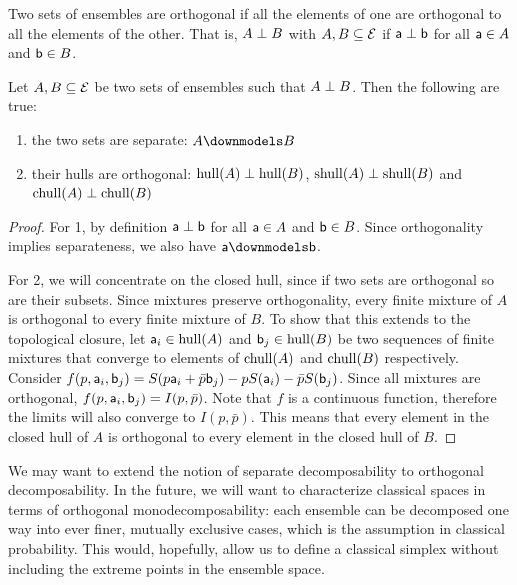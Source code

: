 \begin{mathSection}
\begin{defn}
	Two sets of ensembles are orthogonal if all the elements of one are orthogonal to all the elements of the other. That is, $A \ortho B$ with $A, B \subseteq \Ens$ if $\ens[a] \ortho \ens[b]$ for all $\ens[a] \in A$ and $\ens[b] \in B$. 
\end{defn}

\begin{prop}
	Let $A, B \subseteq \Ens$ be two sets of ensembles such that $A \ortho B$. Then the following are true:
	\begin{enumerate}
		\item the two sets are separate: $A \separate B$
		\item their hulls are orthogonal: $\hull(A) \ortho \hull(B)$, $\shull(A) \ortho \shull(B)$ and  \\ $\chull(A) \ortho \chull(B)$
	\end{enumerate}
\end{prop}

\begin{proof}
	For 1, by definition $\ens[a] \ortho \ens[b]$ for all $\ens[a] \in A$ and $\ens[b] \in B$. Since orthogonality implies separateness, we also have $\ens[a] \separate \ens[b]$.
	
	For 2, we will concentrate on the closed hull, since if two sets are orthogonal so are their subsets. Since mixtures preserve orthogonality, every finite mixture of $A$ is orthogonal to every finite mixture of $B$. To show that this extends to the topological closure, let $\ens[a]_i \in \hull(A)$ and $\ens[b]_j \in \hull(B)$ be two sequences of finite mixtures that converge to elements of $\chull(A)$ and $\chull(B)$ respectively. Consider $f(p,\ens[a]_i, \ens[b]_j) = S(p \ens[a]_i + \bar{p} \ens[b]_j) - p S(\ens[a]_i) - \bar{p} S(\ens[b]_j)$. Since all mixtures are orthogonal, $f(p,\ens[a]_i, \ens[b]_j) = I(p,\bar{p})$. Note that $f$ is a continuous function, therefore the limits will also converge to $I(p,\bar{p})$. This means that every element in the closed hull of $A$ is orthogonal to every element in the closed hull of $B$.
\end{proof}
\end{mathSection}

We may want to extend the notion of separate decomposability to orthogonal decomposability. In the future, we will want to characterize classical spaces in terms of orthogonal monodecomposability: each ensemble can be decomposed one way into ever finer, mutually exclusive cases, which is the assumption in classical probability. This would, hopefully, allow us to define a classical simplex without including the extreme points in the ensemble space.

